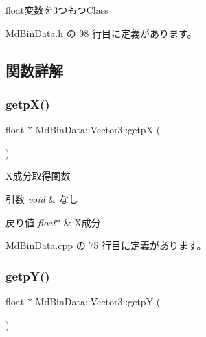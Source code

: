 float変数を3つもつ\+Class 

 Md\+Bin\+Data.\+h の 98 行目に定義があります。



\subsection{関数詳解}
\mbox{\label{class_md_bin_data_1_1_vector3_a92662563dc33035c94d457cd96d7972e}} 
\subsubsection{\texorpdfstring{getp\+X()}{getpX()}}
{\footnotesize\ttfamily float $\ast$ Md\+Bin\+Data\+::\+Vector3\+::getpX (\begin{DoxyParamCaption}{ }\end{DoxyParamCaption})}



X成分取得関数 


\begin{DoxyParams}{引数}
{\em void} & なし \\
\hline
\end{DoxyParams}

\begin{DoxyRetVals}{戻り値}
{\em float$\ast$} & X成分 \\
\hline
\end{DoxyRetVals}


 Md\+Bin\+Data.\+cpp の 75 行目に定義があります。

\mbox{\label{class_md_bin_data_1_1_vector3_aaf3534a3038219e74875d002255e0c27}} 
\subsubsection{\texorpdfstring{getp\+Y()}{getpY()}}
{\footnotesize\ttfamily float $\ast$ Md\+Bin\+Data\+::\+Vector3\+::getpY (\begin{DoxyParamCaption}{ }\end{DoxyParamCaption})}



